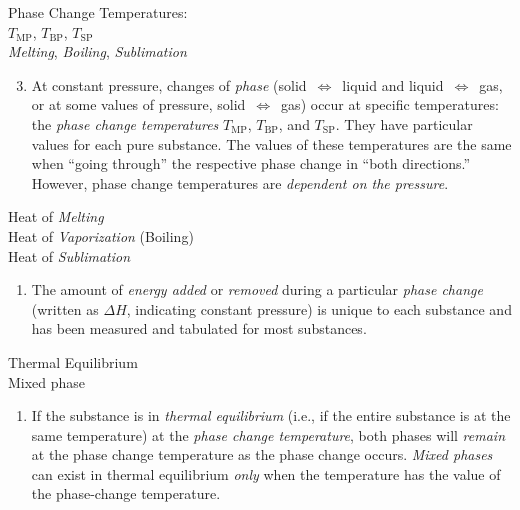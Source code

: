 \noindent
\begin{minipage}[c]{\leftcolumn}
	\baselineskip
	Phase Change Temperatures:\\
	\hspace*{5mm}$T_\text{MP}$, $T_\text{BP}$, $T_\text{SP}$\\
	\emph{Melting}, \emph{Boiling}, \emph{Sublimation}
\end{minipage}
\begin{minipage}[c]{\rightcolumn}
\begin{enumerate}\setcounter{enumi}{2}
	\item At constant pressure, changes of {\em phase} (solid~$\Leftrightarrow$~liquid and liquid~$\Leftrightarrow$~gas, or at some values of pressure, solid~$\Leftrightarrow$~gas) occur at specific temperatures: the \emph{phase change temperatures} $T_\text{MP}$, $T_\text{BP}$, and $T_\text{SP}$. They have particular values for each pure substance. The values of these temperatures are the same when ``going through'' the respective phase change in ``both directions.'' However, phase change temperatures are \emph{dependent on the pressure}.\\[0.2mm]
	\end{enumerate}
\end{minipage}

\noindent
\begin{minipage}[c]{\leftcolumn}
	\baselineskip
	Heat of \emph{Melting}\\
	Heat of \emph{Vaporization} (Boiling)\\
	Heat of \emph{Sublimation}\\[0.1mm]
\end{minipage}
\begin{minipage}[c]{\rightcolumn}
	\begin{enumerate}
		\item[] The amount of \emph{energy added} or \emph{removed} during a particular \emph{phase change} (written as $\Delta H$, indicating constant pressure) is unique to each substance and has been measured and tabulated for most substances.\\[0.2mm]
	\end{enumerate}
\end{minipage}

\noindent
\begin{minipage}[c]{\leftcolumn}
	\baselineskip
	Thermal Equilibrium\\
	Mixed phase
\end{minipage}
\begin{minipage}[c]{\rightcolumn}
	\begin{enumerate}
		\item[] If the substance is in \emph{thermal equilibrium} (i.e., if the entire substance is at the same temperature) at the \emph{phase change temperature}, both phases will \emph{remain} at the phase change temperature as the phase change occurs. \emph{Mixed phases} can exist in thermal equilibrium {\em only} when the temperature has the value of the phase-change temperature.\\[0.2mm]
	\end{enumerate}
\end{minipage}

